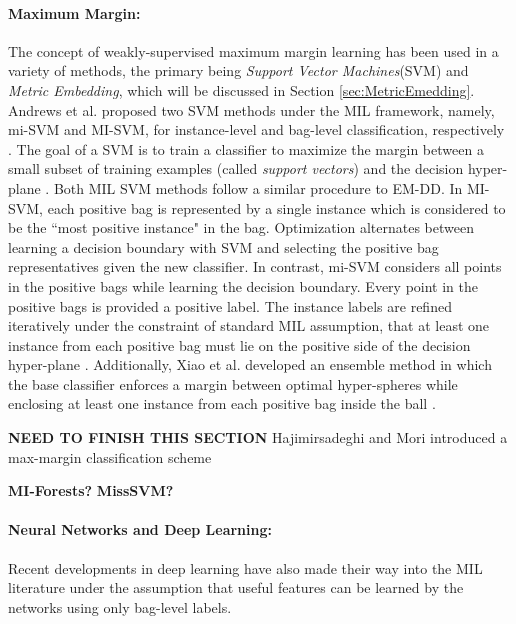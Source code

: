 \paragraph{Maximum Margin:}
The concept of weakly-supervised maximum margin learning has been used in a variety of methods, the primary being \textit{Support Vector Machines}(SVM) and \textit{Metric Embedding}, which will be discussed in Section \ref{sec:MetricEmedding}.  Andrews et al. proposed two SVM methods under the MIL framework, namely, mi-SVM and MI-SVM, for instance-level and bag-level classification,  respectively \citep{Carbonneau2016MILSurvey,Du2017Thesis,Jiao2017Thesis}.  The goal of a SVM is to train a classifier to maximize the margin between a small subset of training examples (called \textit{support vectors}) and the decision hyper-plane \citep{Murphy2012}.  Both MIL SVM methods follow a similar procedure to EM-DD.  In MI-SVM, each positive bag is represented by a single instance which is considered to be the ``most positive instance" in the bag. Optimization alternates between learning a decision boundary with SVM and selecting the positive bag representatives given the new classifier. In contrast, mi-SVM considers all points in the positive bags while learning the decision boundary.  Every point in the positive bags is provided a positive label.  The instance labels are refined iteratively under the constraint of standard MIL assumption, that at least one instance from each positive bag must lie on the positive side of the decision hyper-plane \citep{Cao2016VehicleDetectionMIL}.  Additionally, Xiao et al. developed an ensemble method in which the base classifier enforces a margin between optimal hyper-spheres while enclosing at least one instance from each positive bag inside the ball \citep{Xiao2017SphereMIL}. 

\textbf{NEED TO FINISH THIS SECTION}
Hajimirsadeghi and Mori introduced a max-margin classification scheme 

\textbf{MI-Forests?} 
\textbf{MissSVM?}



\paragraph{Neural Networks and Deep Learning:}

Recent developments in deep learning have also made their way into the MIL literature under the assumption that useful features can be learned by the networks using only bag-level labels.  

